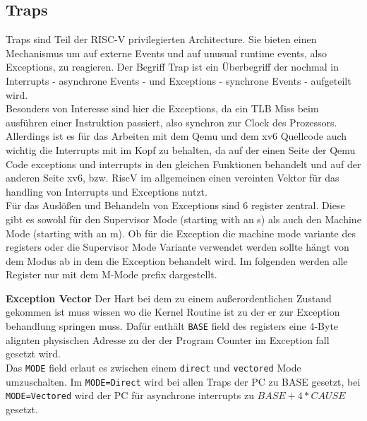 \subsection{Traps}
Traps sind Teil der RISC-V privilegierten Architecture. Sie bieten einen Mechanismus
um auf externe Events und auf unusual runtime events, also Exceptions, zu reagieren\cite{riscvreader}.
Der Begriff Trap ist ein Überbegriff der nochmal in Interrupts - asynchrone Events - und
Exceptions - synchrone Events - aufgeteilt wird.\\
Besonders von Interesse sind hier die Exceptions, da ein TLB Miss beim ausführen einer Instruktion
passiert, also synchron zur Clock des Prozessors. Allerdings ist es für das Arbeiten mit
dem Qemu und dem xv6 Quellcode auch wichtig die Interrupts mit im Kopf zu behalten, da auf der
einen Seite der Qemu Code exceptions und interrupts in den gleichen Funktionen behandelt und
auf der anderen Seite xv6, bzw. RiscV im allgemeinen einen vereinten Vektor für das handling
von Interrupts und Exceptions nutzt\cite{RISCVInstructionSet}. \\

Für das Auslößen und Behandeln von Exceptions sind 6 register zentral. Diese gibt es sowohl
für den Supervisor Mode (starting with an s) als auch den Machine Mode (starting with an m).
 Ob für die Exception die machine mode variante des
registers oder die Supervisor Mode Variante verwendet werden sollte hängt von dem Modus ab
in dem die Exception behandelt wird. Im folgenden werden alle Register nur mit dem M-Mode 
prefix dargestellt. 


\textbf{Exception Vector} Der Hart  bei dem zu einem
außerordentlichen Zustand gekommen ist muss wissen wo die Kernel Routine ist zu der er zur
Exception behandlung springen muss. Dafür enthält \texttt{BASE} field des registers eine
4-Byte alignten physischen Adresse zu der der Program Counter im Exception fall gesetzt wird.\\
Das \texttt{MODE} field erlaut es zwischen einem \texttt{direct} und \texttt{vectored} Mode
umzuschalten. Im \texttt{MODE=Direct} wird bei allen Traps der PC zu BASE gesetzt, bei
\texttt{MODE=Vectored} wird der PC für asynchrone interrupts zu $ BASE+4*CAUSE $ gesetzt.\\

